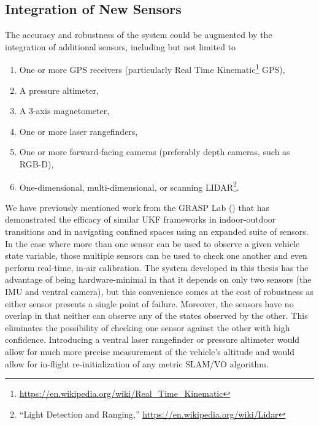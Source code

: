 \subsection{Integration of New Sensors}
The accuracy and robustness of the system could be augmented by the integration of additional sensors, including but not limited to
\begin{enumerate}
    \item One or more GPS receivers (particularly Real Time Kinematic\footnote{\url{https://en.wikipedia.org/wiki/Real_Time_Kinematic}} GPS),
    \item A pressure altimeter,
    \item A 3-axis magnetometer,
    \item One or more laser rangefinders,
    \item One or more forward-facing cameras (preferably depth cameras, such as RGB-D),
    \item One-dimensional, multi-dimensional, or scanning LIDAR\footnote{``Light Detection and Ranging,'' \url{https://en.wikipedia.org/wiki/Lidar}}.
\end{enumerate}
We have previously mentioned work from the GRASP Lab (\cite{Shen2011}) that has demonstrated the efficacy of similar UKF frameworks in indoor-outdoor transitions and in navigating confined spaces using an expanded suite of sensors. In the case where more than one sensor can be used to observe a given vehicle state variable, those multiple sensors can be used to check one another and even perform real-time, in-air calibration. The system developed in this thesis has the advantage of being hardware-minimal in that it depends on only two sensors (the IMU and ventral camera), but this convenience comes at the cost of robustness as either sensor presents a single point of failure. Moreover, the sensors have no overlap in that neither can observe any of the states observed by the other. This eliminates the possibility of checking one sensor against the other with high confidence. Introducing a ventral laser rangefinder or pressure altimeter would allow for much more precise measurement of the vehicle's altitude and would allow for in-flight re-initialization of any metric SLAM/VO algorithm.

